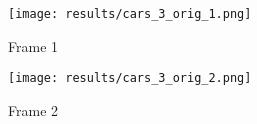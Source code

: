 \documentclass[12pt]{article}
\begin{document}
\begin{itemize}
\begin{enumerate}
    \begin{figure}[H]
        \centering
        \begin{minipage}{.45\textwidth}
            \centering
            \texttt{[image: results/cars\_3\_orig\_1.png]}
            \caption*{Frame 1}
        \end{minipage}
        \begin{minipage}{.45\textwidth}
            \centering
            \texttt{[image: results/cars\_3\_orig\_2.png]}
            \caption*{Frame 2}
        \end{minipage}
    \end{figure}
\end{enumerate}
\end{itemize}
\end{document}
